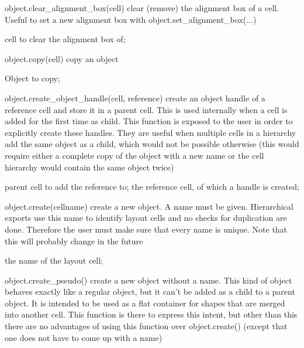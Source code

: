 \begin{APIfunc}{object.clear\_alignment\_box(cell)}
    clear (remove) the alignment box of a cell. Useful to set a new alignment box with object.set\_alignment\_box(...)
    \begin{APIparameters}
            cell to clear the alignment box of;
    \end{APIparameters}
\end{APIfunc}
\begin{APIfunc}{object.copy(cell)}
    copy an object
    \begin{APIparameters}
            Object to copy;
    \end{APIparameters}
\end{APIfunc}
\begin{APIfunc}{object.create\_object\_handle(cell, reference)}
    create an object handle of a reference cell and store it in a parent cell. This is used internally when a cell is added for the first time as child. This function is exposed to the user in order to explicitly create these handles. They are useful when multiple cells in a hierarchy add the same object as a child, which would not be possible otherwise (this would require either a complete copy of the object with a new name or the cell hierarchy would contain the same object twice)
    \begin{APIparameters}
            parent cell to add the reference to;
            the reference cell, of which a handle is created;
    \end{APIparameters}
\end{APIfunc}
\begin{APIfunc}{object.create(cellname)}
    create a new object. A name must be given. Hierarchical exports use this name to identify layout cells and no checks for duplication are done. Therefore the user must make sure that every name is unique. Note that this will probably change in the future
    \begin{APIparameters}
            the name of the layout cell;
    \end{APIparameters}
\end{APIfunc}
\begin{APIfunc}{object.create\_pseudo()}
    create a new object without a name. This kind of object behaves exactly like a regular object, but it can't be added as a child to a parent object. It is intended to be used as a flat container for shapes that are merged into another cell. This function is there to express this intent, but other than this there are no advantages of using this function over object.create() (except that one does not have to come up with a name)
    \begin{APIparameters}
    \end{APIparameters}
\end{APIfunc}
